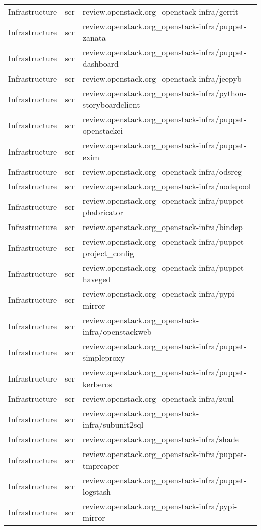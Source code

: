 \begin{center}
\begin{longtable}{|p{4cm}|p{1cm}|p{10cm}|}
Infrastructure&scr&review.openstack.org\_openstack-infra/gerrit\\ 
Infrastructure&scr&review.openstack.org\_openstack-infra/puppet-zanata\\ 
Infrastructure&scr&review.openstack.org\_openstack-infra/puppet-dashboard\\ 
Infrastructure&scr&review.openstack.org\_openstack-infra/jeepyb\\ 
Infrastructure&scr&review.openstack.org\_openstack-infra/python-storyboardclient\\ 
Infrastructure&scr&review.openstack.org\_openstack-infra/puppet-openstackci\\ 
Infrastructure&scr&review.openstack.org\_openstack-infra/puppet-exim\\ 
Infrastructure&scr&review.openstack.org\_openstack-infra/odsreg\\ 
Infrastructure&scr&review.openstack.org\_openstack-infra/nodepool\\ 
Infrastructure&scr&review.openstack.org\_openstack-infra/puppet-phabricator\\ 
Infrastructure&scr&review.openstack.org\_openstack-infra/bindep\\ 
Infrastructure&scr&review.openstack.org\_openstack-infra/puppet-project\_config\\ 
Infrastructure&scr&review.openstack.org\_openstack-infra/puppet-haveged\\ 
Infrastructure&scr&review.openstack.org\_openstack-infra/pypi-mirror\\ 
Infrastructure&scr&review.openstack.org\_openstack-infra/openstackweb\\ 
Infrastructure&scr&review.openstack.org\_openstack-infra/puppet-simpleproxy\\ 
Infrastructure&scr&review.openstack.org\_openstack-infra/puppet-kerberos\\ 
Infrastructure&scr&review.openstack.org\_openstack-infra/zuul\\ 
Infrastructure&scr&review.openstack.org\_openstack-infra/subunit2sql\\ 
Infrastructure&scr&review.openstack.org\_openstack-infra/shade\\ 
Infrastructure&scr&review.openstack.org\_openstack-infra/puppet-tmpreaper\\ 
Infrastructure&scr&review.openstack.org\_openstack-infra/puppet-logstash\\ 
Infrastructure&scr&review.openstack.org\_openstack-infra/pypi-mirror\\ 

\end{longtable}
\end{center}
